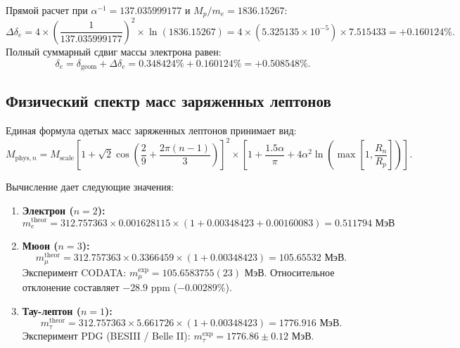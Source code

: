 \documentclass[11pt,a4paper]{article}
\theoremstyle{definition}
\theoremstyle{remark}
\begin{document}
Прямой расчет при $\alpha^{-1} = 137.035999177$ и $M_p/m_e = 1836.15267$:
\begin{equation}
    \Delta \delta_e = 4 \times \left( \frac{1}{137.035999177} \right)^2 \times \ln(1836.15267) = 4 \times (5.325135 \times 10^{-5}) \times 7.515433 = \mathbf{+0.160124\%}.
\end{equation}
Полный суммарный сдвиг массы электрона равен:
\begin{equation}
    \delta_e = \delta_{\mathrm{geom}} + \Delta \delta_e = 0.348424\% + 0.160124\% = \mathbf{+0.508548\%}.
\end{equation}

\subsection{Физический спектр масс заряженных лептонов}
Единая формула одетых масс заряженных лептонов принимает вид:
\begin{equation}
    M_{\mathrm{phys}, n} = M_{\mathrm{scale}} \left[ 1 + \sqrt{2} \cos\left( \frac{2}{9} + \frac{2\pi(n-1)}{3} \right) \right]^2 \times \left[ 1 + \frac{1.5\alpha}{\pi} + 4\alpha^2 \ln\left( \max\left[ 1, \frac{R_n}{R_p} \right] \right) \right].
    \label{eq:dressed_leptons}
\end{equation}

Вычисление дает следующие значения:
\begin{enumerate}
    \item \textbf{Электрон ($n=2$):}
    \begin{equation}
        m_e^{\mathrm{theor}} = 312.757363 \times 0.001628115 \times (1 + 0.00348423 + 0.00160083) = \mathbf{0.511794\text{ МэВ}}
    \end{equation}
    
    \item \textbf{Мюон ($n=3$):}
    \begin{equation}
        m_\mu^{\mathrm{theor}} = 312.757363 \times 0.3366459 \times (1 + 0.00348423) = \mathbf{105.65532\text{ МэВ}}.
    \end{equation}
    Эксперимент CODATA: $m_\mu^{\mathrm{exp}} = 105.6583755(23)$ МэВ. Относительное отклонение составляет $-28.9\text{ ppm}$ ($-0.00289\%$).
    
    \item \textbf{Тау-лептон ($n=1$):}
    \begin{equation}
        m_\tau^{\mathrm{theor}} = 312.757363 \times 5.661726 \times (1 + 0.00348423) = \mathbf{1776.916\text{ МэВ}}.
    \end{equation}
    Эксперимент PDG (BESIII / Belle II): $m_\tau^{\mathrm{exp}} = 1776.86 \pm 0.12$ МэВ.
\end{enumerate}
\end{document}
